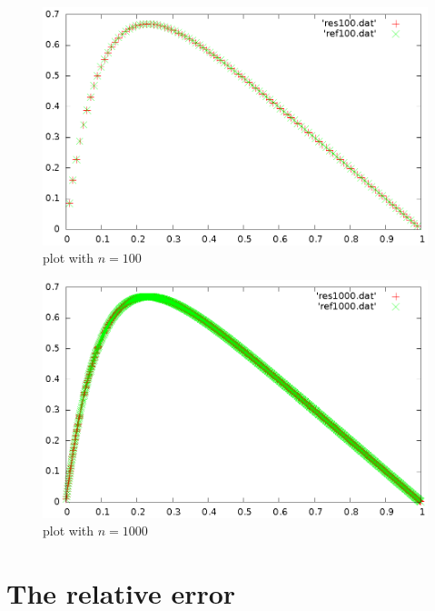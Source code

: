 \documentclass[11pt,a4wide]{article}
\begin{document}
\begin{figure}[H]
	\centering
		\includegraphics[scale=0.5,angle=-90]{plot100.eps}
	\caption{plot with $n=100$}
	\label{fig:plot100}
\end{figure}
\begin{figure}[H]
	\centering
		\includegraphics[scale=0.5, angle=-90]{plot1000.eps}
	\caption{plot with $n=1000$}
	\label{fig:plot1000}
\end{figure}
\section{The relative error}
\end{document}
